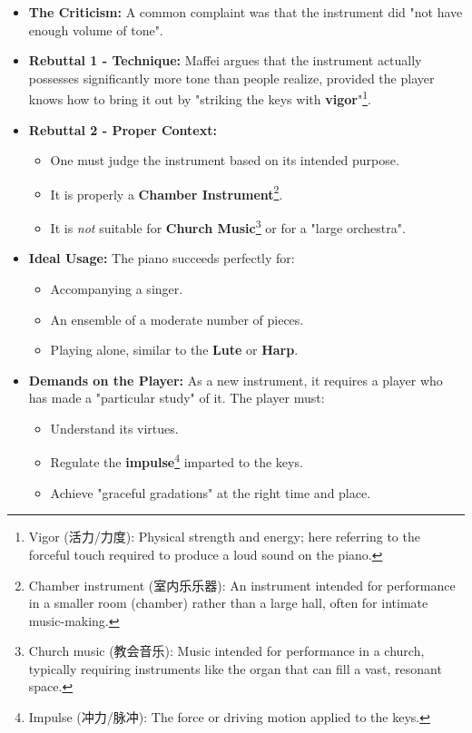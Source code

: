 \documentclass[math,code]{amznotes}
\theoremstyle{remark}
\begin{document}
\begin{itemize}
    \item \textbf{The Criticism:} A common complaint was that the instrument did "not have enough volume of tone".
    \item \textbf{Rebuttal 1 - Technique:} Maffei argues that the instrument actually possesses significantly more tone than people realize, provided the player knows how to bring it out by "striking the keys with \textbf{vigor}"\footnote{Vigor (活力/力度): Physical strength and energy; here referring to the forceful touch required to produce a loud sound on the piano.}.
    \item \textbf{Rebuttal 2 - Proper Context:}
    \begin{itemize}
        \item One must judge the instrument based on its intended purpose.
        \item It is properly a \textbf{Chamber Instrument}\footnote{Chamber instrument (室内乐乐器): An instrument intended for performance in a smaller room (chamber) rather than a large hall, often for intimate music-making.}.
        \item It is \textit{not} suitable for \textbf{Church Music}\footnote{Church music (教会音乐): Music intended for performance in a church, typically requiring instruments like the organ that can fill a vast, resonant space.} or for a "large orchestra".
    \end{itemize}
    \item \textbf{Ideal Usage:} The piano succeeds perfectly for:
    \begin{itemize}
        \item Accompanying a singer.
        \item An ensemble of a moderate number of pieces.
        \item Playing alone, similar to the \textbf{Lute} or \textbf{Harp}.
    \end{itemize}
    \item \textbf{Demands on the Player:} As a new instrument, it requires a player who has made a "particular study" of it. The player must:
    \begin{itemize}
        \item Understand its virtues.
        \item Regulate the \textbf{impulse}\footnote{Impulse (冲力/脉冲): The force or driving motion applied to the keys.} imparted to the keys.
        \item Achieve "graceful gradations" at the right time and place.
    \end{itemize}
\end{itemize}
\end{document}
